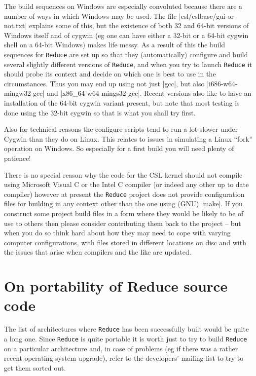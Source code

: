 \documentclass[12pt,twoside,openright]{memoir}
\newcommand{\reduce}{\texttt{Reduce}\xspace}
\begin{document}
The build sequences on Windows are especially convoluted because there are
a number of ways in which Windows may be used. The file
|csl/cslbase/gui-or-not.txt| explains some of this, but the existence of
both 32 and 64-bit versions of Windows itself and of cygwin (eg one can
have either a 32-bit or a 64-bit cygwin shell on a 64-bit Windows) makes
life messy. As a result of this the build sequences for \reduce are set
up so that they (automatically) configure and build several slightly
different versions of \reduce, and when you try to launch \reduce it should
probe its context and decide on which one is best to use in the
circumstances. Thus you may end up using not just |gcc|, but also
|i686-w64-mingw32-gcc| and |x86_64-w64-mings32-gcc|. Recent versions also like
to have an installation of the 64-bit cygwin variant present, but note that
most testing is done using the 32-bit cygwin so that is what you shall try
first.

Also for technical reasons the configure scripts tend to run a lot slower under
Cygwin than they do on Linux. This relates to issues in simulating a Linux
``fork'' operation on Windows. So especially for a first build you will need
plenty of patience!

There is no special reason why the code for the CSL kernel should not compile
using Microsoft Visual C or the Intel C compiler (or indeed any other up to
date compiler) however at present the \reduce project does not provide
configuration files for building in any context other than the one using (GNU)
|make|. If you construct some project build files in a form where they would be
likely to be of use to others then please consider contributing them back to
the project -- but when you do so think hard about how they may need to cope
with varying computer configurations, with files stored in different locations
on disc and with the issues that arise when compilers and the like are updated.

\section{On portability of Reduce source code}

The list of architectures where \reduce has been successfully built would be
quite a long one. Since \reduce is quite portable it is worth just to try to
build \reduce on a particular architecture and, in case of problems (eg if
there was a rather recent operating system upgrade), refer to the
developers' mailing list to try to get them sorted out.
\end{document}

